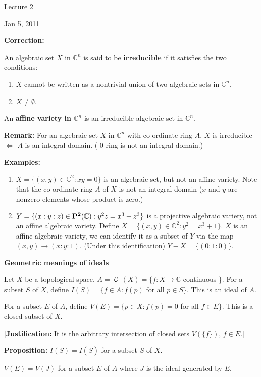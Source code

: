 \documentclass[11pt]{article}
\newcommand{\ra}{\rightarrow}
\newcommand{\Lr}{\Leftrightarrow}
\newcommand{\es}{\emptyset}
\newcommand{\co}{\mathbb{C}}
\begin{document}
\begin{center}
Lecture 2

Jan 5, 2011
\end{center}


{\bf Correction:}


An algebraic set $X$ in $\co^n$ is said to be {\bf irreducible} if it satisfies the two conditions:
\begin{enumerate}
\item $X$ cannot be written as a nontrivial union of two algebraic sets in $\co^n$.
\item $X\neq \es$.
\end{enumerate}

An {\bf affine variety in $\co^n$} is an irreducible algebraic set in $\co^n$.

{\bf Remark:} For an algebraic set $X$ in $\co^n$ with co-ordinate ring $A$, $X$ is irreducible $\Lr$ $A$ is an integral domain. ( $0$ ring is not an integral domain.)

{\bf Examples:}
\begin{enumerate}
\item $X = \{(x,y) \in \co^2 : xy = 0\}$ is an algebraic set, but not an affine variety. Note that the co-ordinate ring $A$ of $X$ is not an integral domain  ($x$ and $y$ are nonzero elements whose product is zero.)
\item $Y= \{(x:y:z)\in {\bf P ^2}(\co): y^2z = x^3+z^3 \}$ is a projective algebraic variety, not an affine algebraic variety. Define $X = \{(x,y) \in \co^2 : y^2 = x^3 + 1\}$. $X$ is an affine algebraic variety, we can identify it as a subset of $Y$ via the map $(x,y) \ra (x:y:1)$. (Under this identification) $Y-X = \{(0:1:0)\}$.

\end{enumerate}

{\bf Geometric meanings of ideals}

Let $X$ be a topological space.
$A=$ $\cal{C}$ $ (X)= \{f:X\ra \co$  continuous $\}$.
For a subset $S$ of $X$, define $I(S)= \{ f\in A: f(p)$ for all $ p\in S\}$. This is an ideal of $A$.

For a subset $E$ of $A$, define $V(E)=\{p \in X: f(p)=0$ for all $f\in E\}$. This is a closed subset of $X$.

[{\bf Justification:} It is the arbitrary intersection of closed sets $V(\{f\})$, $f\in E$.]

{\bf Proposition:} $I(S) = I(\overline S )$ for a subset $S$ of $X$.

$V(E) = V(J)$ for a subset $E$ of $A$ where $J$ is the ideal generated by $E$.
\end{document}
